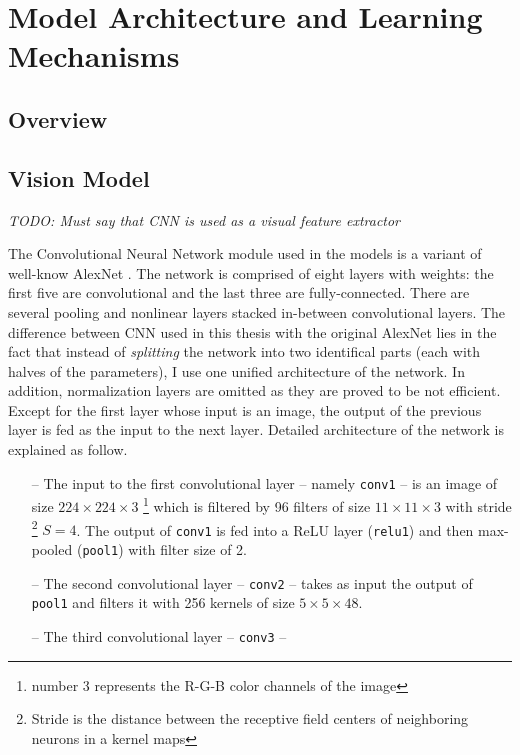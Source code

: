 \chapter{Model Architecture and Learning Mechanisms}

\section{Overview}

\section{Vision Model}
\textit{TODO: Must say that CNN is used as a visual feature extractor}

The Convolutional Neural Network module used in the models is a variant of well-know AlexNet \cite{NIPS2012_4824}. The network is comprised of eight layers with weights: the first five are convolutional and the last three are fully-connected. There are several pooling and nonlinear layers stacked in-between convolutional layers. The difference between CNN used in this thesis with the original AlexNet lies in the fact that instead of \textit{splitting} the network into two identifical parts (each with halves of the parameters), I use one unified architecture of the network. In addition, normalization layers are omitted as they are proved to be not efficient. Except for the first layer whose input is an image, the output of the previous layer is fed as the input to the next layer. Detailed architecture of the network is explained as follow.

\begin{itemize}
	\item[--] The input to the first convolutional layer  -- namely \texttt{conv1} -- is an image of size $224 \times 224 \times 3$ \footnote{number 3 represents the R-G-B color channels of the image} which is filtered by 96 filters of size $11 \times 11 \times 3$ with stride \footnote{Stride is the distance between the receptive field centers of neighboring neurons in a kernel maps} $S = 4$. The output of \texttt{conv1} is fed into a ReLU layer (\texttt{relu1}) and then max-pooled (\texttt{pool1}) with filter size of 2.

	\item[--] The second convolutional layer  -- \texttt{conv2} -- takes as input the output of \texttt{pool1} and filters it with 256 kernels of size $5 \times 5 \times 48$.

	\item[--] The third convolutional layer -- \texttt{conv3} -- 
\end{itemize}

